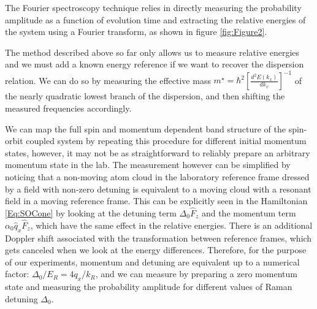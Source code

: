 The Fourier spectroscopy technique relies in directly measuring the probability amplitude as a function of evolution time and extracting the relative energies of the system using a Fourier transform, as shown in figure \ref{fig:Figure2}.

 

The method described above so far only allows us to measure relative energies and we must add a known energy reference if we want to recover the dispersion relation. We can do so by measuring the effective mass $m^{\star} = \hbar^2[\frac{d^2E(k_x)}{dk_x}]^{-1}$ of the nearly quadratic lowest branch of the dispersion, and then shifting the measured frequencies accordingly. 

We can map the full spin and momentum dependent band structure of the spin-orbit coupled system by repeating this procedure for different initial momentum states, however, it may not be as straightforward to reliably prepare an arbitrary momentum state in the lab. The measurement however can be simplified by noticing that a non-moving atom cloud in the laboratory reference frame dressed by a field with non-zero detuning is equivalent to a moving cloud with a resonant field in a moving reference frame. This can be explicitly seen in the Hamiltonian \ref{Eq:SOCone} by looking at the detuning term $\Delta_0\hat{F}_z$ and the momentum term $\alpha_0\hat{q}_x\hat{F}_z$, which have the same effect in the relative energies. There is an additional Doppler shift associated with the transformation between reference frames, which gets canceled when we look at the energy differences. Therefore, for the purpose of our experiments, momentum and detuning are equivalent up to a numerical factor: $\Delta_0/E_R=4q_x/k_R$, and we can measure by preparing a zero momentum state and measuring the probability amplitude for different values of Raman detuning $\Delta_0$. 

